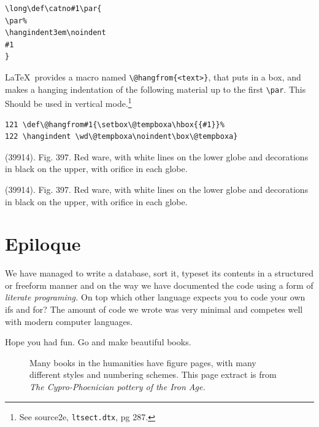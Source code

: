\begin{verbatim}
\long\def\catno#1\par{
\par%
\hangindent3em\noindent
#1
}
\end{verbatim}


\def\catno#1#2{%
    \@hangfrom{#1. }#2
}


\DescribeMacro{\@hangfrom}   
\LaTeX\ provides a macro named \verb+\@hangfrom{<text>}+, that puts  in a box, and makes a hanging indentation of the following material up to the first \verb+\par+. This Should be used in vertical mode.\footnote{See source2e, \texttt{ltsect.dtx}, pg 287.}

\begin{verbatim}
121 \def\@hangfrom#1{\setbox\@tempboxa\hbox{{#1}}%
122 \hangindent \wd\@tempboxa\noindent\box\@tempboxa}
\end{verbatim}

\medskip

\catno{289}{(39914). Fig. 397. Red ware, with white lines on the lower globe and decorations in black on the upper, with orifice in each globe.}

\catno{1289}{(39914). Fig. 397. Red ware, with white lines on the lower globe and decorations in black on the upper, with orifice in each globe.}


\makeatother

\section{Epiloque}

We have managed to write a database, sort it, typeset its contents in a structured or freeform manner
and on the way we have documented the code using a form of \textit{literate programing.} On top which
other language expects you to code your own ifs and for? 
The amount of code we wrote was very minimal and competes well with modern computer languages. 

Hope you had fun. Go and make beautiful books. 

\begin{figure}[htp]
\centering
{\color{thegray}
}
\caption{Many books in the humanities have figure pages, with many different styles and numbering schemes. This page extract is from \textit{The Cypro-Phoenician pottery of the Iron Age. }  \citep{schreiber1971}}
\end{figure}


